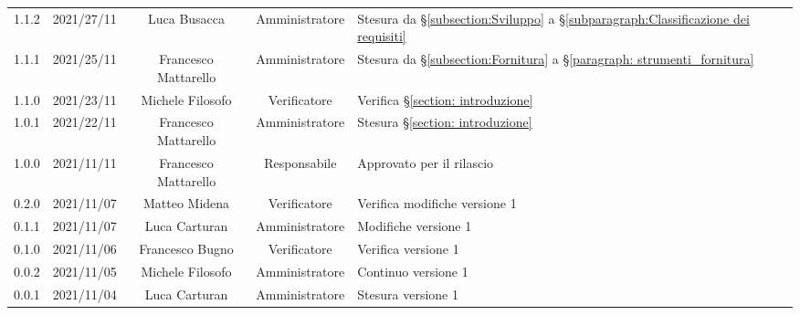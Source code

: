 \begin{center}
\begin{longtable}[c]{c | c | c | c | p{5cm}}
		1.1.2 & 2021/27/11 & Luca Busacca & Amministratore & Stesura da §\ref{subsection:Sviluppo} a  §\ref{subparagraph:Classificazione dei requisiti} \\
		1.1.1 & 2021/25/11 & Francesco Mattarello & Amministratore & Stesura da §\ref{subsection:Fornitura} a §\ref{paragraph: strumenti_fornitura} \\
		1.1.0 & 2021/23/11 & Michele Filosofo & Verificatore & Verifica §\ref{section: introduzione} \\
		1.0.1 & 2021/22/11 & Francesco Mattarello & Amministratore & Stesura §\ref{section: introduzione}\\
		1.0.0 & 2021/11/11 & Francesco Mattarello & Responsabile & Approvato per il rilascio\\
		0.2.0 & 2021/11/07 & Matteo Midena & Verificatore & Verifica modifiche versione 1\\
		0.1.1 & 2021/11/07 & Luca Carturan & Amministratore & Modifiche versione 1\\
		0.1.0 & 2021/11/06 & Francesco Bugno & Verificatore & Verifica versione 1\\
		0.0.2 & 2021/11/05 & Michele Filosofo & Amministratore & Continuo versione 1\\
		0.0.1 & 2021/11/04 & Luca Carturan & Amministratore &Stesura versione 1\\


	\end{longtable}
\end{center}
